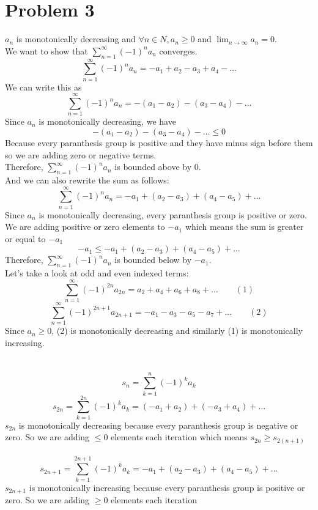 \documentclass{article}
\begin{document}
\section*{Problem 3}
\(a_n\) is monotonically decreasing and \(\forall n \in N, a_n \geq 0\) and \(\lim_{n \rightarrow \infty} a_n = 0\). \\
We want to show that \(\sum_{n=1}^{\infty} (-1)^n a_n\) converges. \\
\[
   \sum_{n=1}^{\infty} (-1)^n a_n = - a_1 + a_2 - a_3 + a_4 - \ldots
\]
We can write this as
\[
   \sum_{n=1}^{\infty} (-1)^n a_n = - (a_1 - a_2) - (a_3 - a_4) - \ldots
\]
Since \(a_n\) is monotonically decreasing, we have
\[
   - (a_1 - a_2) - (a_3 - a_4) - \ldots \leq 0
\]
Because every paranthesis group is positive and they have minus sign before them so we are adding zero or negative terms. \\
Therefore, \(\sum_{n=1}^{\infty} (-1)^n a_n\) is bounded above by 0. \\
And we can also rewrite the sum as follows:
\[
   \sum_{n=1}^{\infty} (-1)^n a_n = -a_1 + (a_2 - a_3) + (a_4 - a_5) + \ldots
\]
Since \(a_n\) is monotonically decreasing, every paranthesis group is positive or zero. We are adding positive or zero elements to \(-a_1\)
which means the sum is greater or equal to \(-a_1\)
\[
   -a_1 \leq -a_1 + (a_2 - a_3) + (a_4 - a_5) + \ldots
\]
Therefore, \(\sum_{n=1}^{\infty} (-1)^n a_n\) is bounded below by \(-a_1\). \\
Let's take a look at odd and even indexed terms:
\[
   \sum_{n=1}^{\infty} (-1)^{2n} a_{2n} = a_2 + a_4 + a_6 + a_8 + \ldots \qquad (1)
\]
\[
   \sum_{n=1}^{\infty} (-1)^{2n+1} a_{2n+1} = -a_1 - a_3 - a_5 - a_7 + \ldots \qquad (2)
\]
Since \(a_n \geq 0\), (2) is monotonically decreasing and similarly (1) is monotonically increasing. \\
\\
\\
\[
   s_n = \sum_{k=1}^{n} (-1)^k a_k
\]
\[
   s_{2n} = \sum_{k=1}^{2n} (-1)^k a_k = (-a_1 + a_2) + (-a_3 + a_4) + \ldots
\]
\(s_{2n}\) is monotonically decreasing because every paranthesis group is negative or zero. So we are adding \(\leq 0\) elements each iteration
which means \(s_{2n} \geq s_{2(n+1)}\) \\
\\
\[
   s_{2n+1} = \sum_{k=1}^{2n+1} (-1)^k a_k = -a_1 + (a_2 - a_3) + (a_4 - a_5) + \ldots
\]
\(s_{2n+1}\) is monotonically increasing because every paranthesis group is positive or zero. So we are adding \(\geq 0\) elements each iteration
\end{document}
